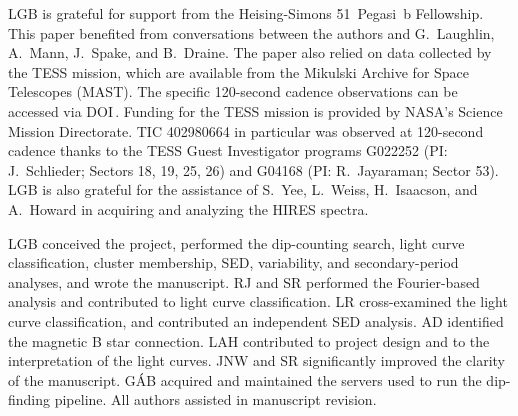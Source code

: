 \documentclass[11pt,twocolumn,tighten]{aastex63}
\begin{document}
\acknowledgments
LGB is grateful for support from the Heising-Simons 51~Pegasi~b
Fellowship.  This paper benefited from conversations between the
authors and G.~Laughlin, A.~Mann, J.~Spake, and B.~Draine.  The paper
also relied on data collected by the TESS mission, which are available
from the Mikulski Archive for Space Telescopes (MAST).  The specific
120-second cadence observations can be accessed via
DOI\,.
Funding for the TESS mission is provided by NASA’s Science Mission
Directorate.  TIC 402980664 in particular was observed at 120-second
cadence thanks to the TESS Guest Investigator programs G022252 (PI:
J.~Schlieder; Sectors 18, 19, 25, 26) and G04168 (PI: R.~Jayaraman;
Sector 53).  LGB is also grateful for the assistance of S.~Yee,
L.~Weiss, H.~Isaacson, and A.~Howard in acquiring and analyzing the
HIRES spectra.

LGB conceived the project, performed the dip-counting search, light curve classification, cluster membership, SED, variability, and secondary-period analyses, and wrote the manuscript.
RJ and SR performed the Fourier-based analysis and contributed to light curve classification.
LR cross-examined the light curve classification, and contributed an independent SED analysis.
AD identified the magnetic B star connection.
LAH contributed to project design and to the interpretation of the light curves.
JNW and SR significantly improved the clarity of the manuscript.
G\'AB acquired and maintained the servers used to run the dip-finding pipeline.
All authors assisted in manuscript revision.

\end{document}
